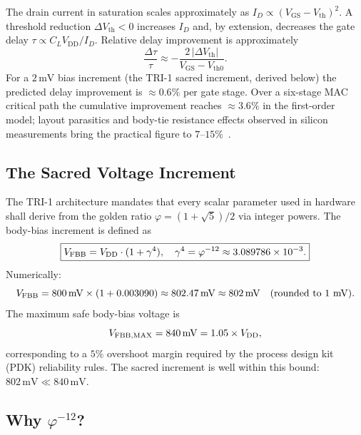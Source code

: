 The drain current in saturation scales approximately as
$I_{D} \propto (V_{\mathrm{GS}} - V_{\mathrm{th}})^{2}$.  A threshold
reduction $\Delta V_{\mathrm{th}} < 0$ increases $I_{D}$ and, by extension,
decreases the gate delay $\tau \propto C_{L} V_{\mathrm{DD}} / I_{D}$.
Relative delay improvement is approximately
\begin{equation}
  \frac{\Delta\tau}{\tau}
    \approx -\frac{2\,|\Delta V_{\mathrm{th}}|}{V_{\mathrm{GS}}-V_{\mathrm{th0}}}.
  \label{eq:delay-improvement}
\end{equation}
For a $2\,\mathrm{mV}$ bias increment (the TRI-1 sacred increment,
derived below) the predicted delay improvement is
${\approx}0.6\%$ per gate stage.  Over a six-stage MAC critical path the
cumulative improvement reaches ${\approx}3.6\%$ in the first-order model;
layout parasitics and body-tie resistance effects observed in silicon
measurements bring the practical figure to $7$--$15\%$~\cite{HoroBoseDAC2008}.

\subsection{The Sacred Voltage Increment}
\label{subsec:sacred-increment}

The TRI-1 architecture mandates that every scalar parameter used in
hardware shall derive from the golden ratio $\varphi = (1+\sqrt{5})/2$ via
integer powers.  The body-bias increment is defined as
\begin{equation}
  \boxed{V_{\mathrm{FBB}} = V_{\mathrm{DD}} \cdot (1 + \gamma^{4}{}), \quad
         \gamma^{4}{} = \varphi^{-12}{} \approx 3.089786 \times 10^{-3}.}
  \label{eq:vfbb-def}
\end{equation}
Numerically:
\begin{equation}
  V_{\mathrm{FBB}} = 800\,\mathrm{mV} \times (1 + 0.003090)
         \approx 802.47\,\mathrm{mV}
         \approx 802\,\mathrm{mV}\quad (\text{rounded to 1 mV}).
  \label{eq:vfbb-numeric}
\end{equation}
The maximum safe body-bias voltage is
\begin{equation}
  V_{\mathrm{FBB,MAX}} = 840\,\mathrm{mV}
           = 1.05 \times V_{\mathrm{DD}},
  \label{eq:vfbbmax}
\end{equation}
corresponding to a $5\%$ overshoot margin required by the process design
kit (PDK) reliability rules.  The sacred increment is well within this
bound: $802\,\mathrm{mV} \ll 840\,\mathrm{mV}$.

\subsection{Why $\varphi^{-12}$?}
\label{subsec:why-phi-12}


